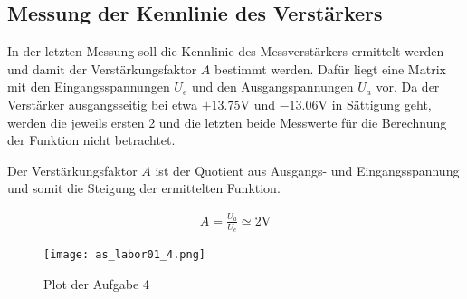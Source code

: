 \subsection{Messung der Kennlinie des Verstärkers}

In der letzten Messung soll die Kennlinie des Messverstärkers ermittelt
werden und damit der Verstärkungsfaktor $A$ bestimmt werden. Dafür liegt
eine Matrix mit den Eingangsspannungen $U_e$ und den Ausgangspannungen
$U_a$ vor. Da der Verstärker ausgangsseitig bei etwa $+13.75\mathrm{V}$
und $-13.06\mathrm{V}$ in Sättigung geht, werden die jeweils ersten 2
und die letzten beide Messwerte für die Berechnung der Funktion nicht
betrachtet.

Der Verstärkungsfaktor $A$ ist der Quotient aus Ausgangs- und Eingangsspannung
und somit die Steigung der ermittelten Funktion.

\begin{equation} \label{eq141}
    \begin{split}
        A=\frac{U_a}{U_e}\simeq2 \mathrm{V}
    \end{split}
\end{equation}

\begin{figure}[H]
 \centering
 \texttt{[image: as\_labor01\_4.png]}
 \caption{Plot der Aufgabe 4}
 \label{fig:PlotAufgabe4}
\end{figure}